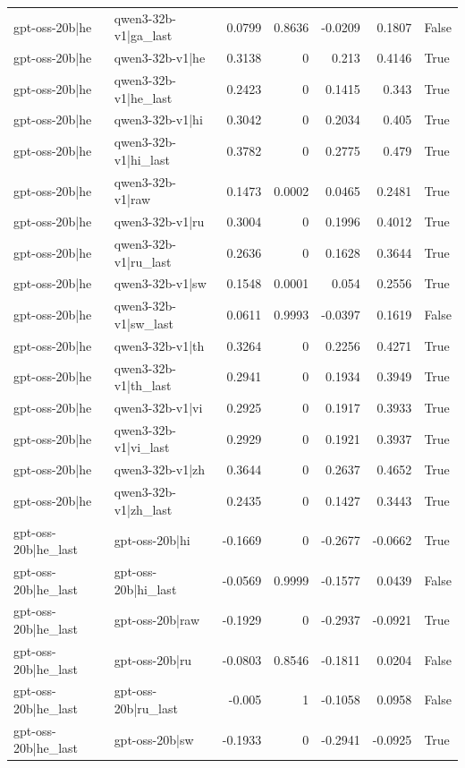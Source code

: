 \begin{table}
\begin{tabular}{l l r r r r l}
gpt-oss-20b|he & qwen3-32b-v1|ga_last & 0.0799 & 0.8636 & -0.0209 & 0.1807 & False \\
gpt-oss-20b|he & qwen3-32b-v1|he & 0.3138 & 0 & 0.213 & 0.4146 & True \\
gpt-oss-20b|he & qwen3-32b-v1|he_last & 0.2423 & 0 & 0.1415 & 0.343 & True \\
gpt-oss-20b|he & qwen3-32b-v1|hi & 0.3042 & 0 & 0.2034 & 0.405 & True \\
gpt-oss-20b|he & qwen3-32b-v1|hi_last & 0.3782 & 0 & 0.2775 & 0.479 & True \\
gpt-oss-20b|he & qwen3-32b-v1|raw & 0.1473 & 0.0002 & 0.0465 & 0.2481 & True \\
gpt-oss-20b|he & qwen3-32b-v1|ru & 0.3004 & 0 & 0.1996 & 0.4012 & True \\
gpt-oss-20b|he & qwen3-32b-v1|ru_last & 0.2636 & 0 & 0.1628 & 0.3644 & True \\
gpt-oss-20b|he & qwen3-32b-v1|sw & 0.1548 & 0.0001 & 0.054 & 0.2556 & True \\
gpt-oss-20b|he & qwen3-32b-v1|sw_last & 0.0611 & 0.9993 & -0.0397 & 0.1619 & False \\
gpt-oss-20b|he & qwen3-32b-v1|th & 0.3264 & 0 & 0.2256 & 0.4271 & True \\
gpt-oss-20b|he & qwen3-32b-v1|th_last & 0.2941 & 0 & 0.1934 & 0.3949 & True \\
gpt-oss-20b|he & qwen3-32b-v1|vi & 0.2925 & 0 & 0.1917 & 0.3933 & True \\
gpt-oss-20b|he & qwen3-32b-v1|vi_last & 0.2929 & 0 & 0.1921 & 0.3937 & True \\
gpt-oss-20b|he & qwen3-32b-v1|zh & 0.3644 & 0 & 0.2637 & 0.4652 & True \\
gpt-oss-20b|he & qwen3-32b-v1|zh_last & 0.2435 & 0 & 0.1427 & 0.3443 & True \\
gpt-oss-20b|he_last & gpt-oss-20b|hi & -0.1669 & 0 & -0.2677 & -0.0662 & True \\
gpt-oss-20b|he_last & gpt-oss-20b|hi_last & -0.0569 & 0.9999 & -0.1577 & 0.0439 & False \\
gpt-oss-20b|he_last & gpt-oss-20b|raw & -0.1929 & 0 & -0.2937 & -0.0921 & True \\
gpt-oss-20b|he_last & gpt-oss-20b|ru & -0.0803 & 0.8546 & -0.1811 & 0.0204 & False \\
gpt-oss-20b|he_last & gpt-oss-20b|ru_last & -0.005 & 1 & -0.1058 & 0.0958 & False \\
gpt-oss-20b|he_last & gpt-oss-20b|sw & -0.1933 & 0 & -0.2941 & -0.0925 & True \\

\end{tabular}
\end{table}
